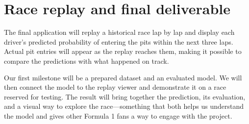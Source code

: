 \documentclass[11pt]{article}
\begin{document}
\section{Race replay and final deliverable}

The final application will replay a historical race lap by lap and display each driver's predicted probability of entering the pits within the next three laps. Actual pit entries will appear as the replay reaches them, making it possible to compare the predictions with what happened on track.

Our first milestone will be a prepared dataset and an evaluated model. We will then connect the model to the replay viewer and demonstrate it on a race reserved for testing. The result will bring together the prediction, its evaluation, and a visual way to explore the race---something that both helps us understand the model and gives other Formula 1 fans a way to engage with the project.
\end{document}
